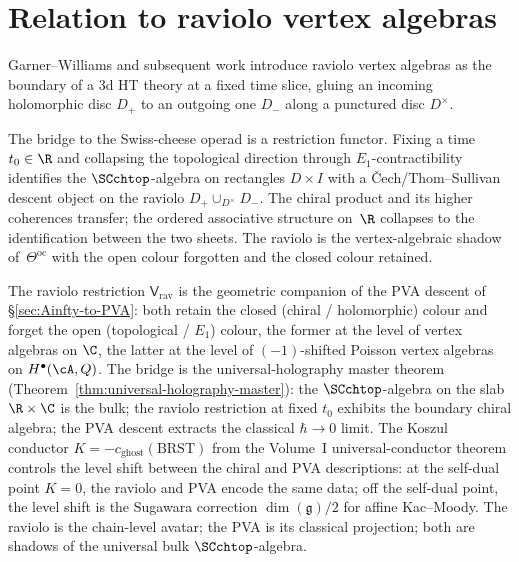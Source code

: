 \section{Relation to raviolo vertex algebras}
\label{sec:raviolo}

Garner--Williams and subsequent work introduce raviolo vertex
algebras as the boundary of a 3d HT theory at a fixed time
slice, gluing an incoming holomorphic disc $D_+$ to an outgoing
one $D_-$ along a punctured disc $D^\times$.

The bridge to the Swiss-cheese operad is a restriction functor. Fixing a time
$t_0 \in \R$ and collapsing the topological direction through
$E_1$-contractibility identifies the $\SCchtop$-algebra on
rectangles $D \times I$ with a \v{C}ech/Thom--Sullivan descent
object on the raviolo $D_+ \cup_{D^\times} D_-$. The chiral
product and its higher coherences transfer; the ordered
associative structure on~$\R$ collapses to the identification
between the two sheets. The raviolo is the
vertex-algebraic shadow of~$\Theta^{\mathrm{oc}}$ with the open
colour forgotten and the closed colour retained.

\begin{remark}
\label{rem:raviolo-bar-quasi-classical-bridge}
The raviolo restriction $\mathsf V_{\mathrm{rav}}$ is the geometric
companion of the PVA descent of \S\ref{sec:Ainfty-to-PVA}: both retain
the closed (chiral / holomorphic) colour and forget the open
(topological / $E_1$) colour, the former at the level of vertex algebras
on $\C$, the latter at the level of $(-1)$-shifted Poisson vertex algebras
on $H^\bullet(\cA, Q)$. The bridge is the universal-holography master
theorem (Theorem~\ref{thm:universal-holography-master}): the $\SCchtop$-algebra on the slab $\R \times \C$ is the bulk;
the raviolo restriction at fixed $t_0$ exhibits the boundary chiral
algebra; the PVA descent extracts the classical $\hbar \to 0$ limit.
The Koszul conductor $K = -c_{\mathrm{ghost}}(\mathrm{BRST})$ from the Volume~I
universal-conductor theorem controls the level shift between the
chiral and PVA descriptions: at the self-dual point $K = 0$, the
raviolo and PVA encode the same data; off the self-dual point, the
level shift is the Sugawara correction $\dim(\mathfrak g)/2$ for
affine Kac--Moody. The raviolo is the chain-level avatar; the PVA is
its classical projection; both are shadows of the universal bulk
$\SCchtop$-algebra.
\end{remark}

